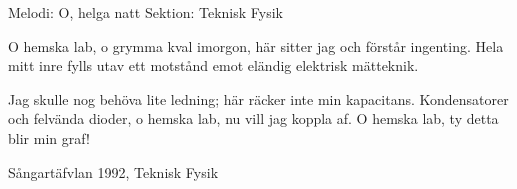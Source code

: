 \begin{song}
\begin{songmeta}
Melodi: O, helga natt
Sektion: Teknisk Fysik
\end{songmeta}

\begin{songtext}
O hemska lab, o grymma kval imorgon,
här sitter jag och förstår ingenting.
Hela mitt inre fylls utav ett motstånd
emot eländig elektrisk mätteknik.

Jag skulle nog behöva lite ledning;
här räcker inte min kapacitans.
Kondensatorer och felvända dioder,
o hemska lab, nu vill jag koppla af.
O hemska lab, ty detta blir min graf!
\end{songtext}
\begin{songnotes}
Sångartäfvlan 1992, Teknisk Fysik
\end{songnotes}
\end{song}
